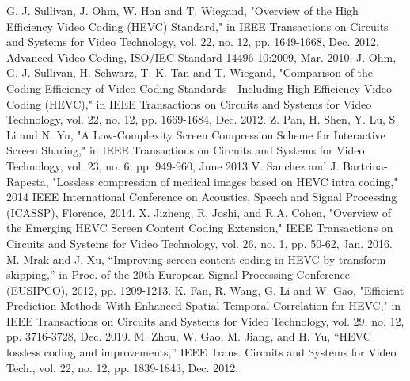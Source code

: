 \documentclass[journal]{IEEEtran}
\begin{document}
%
%
%
\begin{thebibliography}{11}

 G. J. Sullivan, J. Ohm, W. Han and T. Wiegand, "Overview of the High Efficiency Video Coding (HEVC) Standard," in IEEE Transactions on Circuits and Systems for Video Technology, vol. 22, no. 12, pp. 1649-1668, Dec. 2012.
Advanced Video Coding, ISO/IEC Standard 14496-10:2009, Mar. 2010.
 J. Ohm, G. J. Sullivan, H. Schwarz, T. K. Tan and T. Wiegand, "Comparison of the Coding Efficiency of Video Coding Standards—Including High Efficiency Video Coding (HEVC)," in IEEE Transactions on Circuits and Systems for Video Technology, vol. 22, no. 12, pp. 1669-1684, Dec. 2012.
Z. Pan, H. Shen, Y. Lu, S. Li and N. Yu, "A Low-Complexity Screen Compression Scheme for Interactive Screen Sharing," in IEEE Transactions on Circuits and Systems for Video Technology, vol. 23, no. 6, pp. 949-960, June 2013
V. Sanchez and J. Bartrina-Rapesta, "Lossless compression of medical images based on HEVC intra coding," 2014 IEEE International Conference on Acoustics, Speech and Signal Processing (ICASSP), Florence, 2014.
X. Jizheng, R. Joshi, and R.A. Cohen,  "Overview of the Emerging HEVC Screen Content Coding Extension," IEEE Transactions on Circuits and Systems for Video Technology, vol. 26, no. 1, pp. 50-62, Jan. 2016.
M. Mrak and J. Xu, “Improving screen content coding in HEVC by transform skipping,” in Proc. of the 20th European Signal Processing Conference (EUSIPCO), 2012, pp. 1209-1213.
K. Fan, R. Wang, G. Li and W. Gao, "Efficient Prediction Methods With Enhanced Spatial-Temporal Correlation for HEVC," in IEEE Transactions on Circuits and Systems for Video Technology, vol. 29, no. 12, pp. 3716-3728, Dec. 2019.
M. Zhou, W. Gao, M. Jiang, and H. Yu, “HEVC lossless coding and improvements,” IEEE Trans. Circuits and Systems for Video Tech., vol. 22, no. 12, pp. 1839-1843, Dec. 2012. 

\end{thebibliography}
\end{document}
